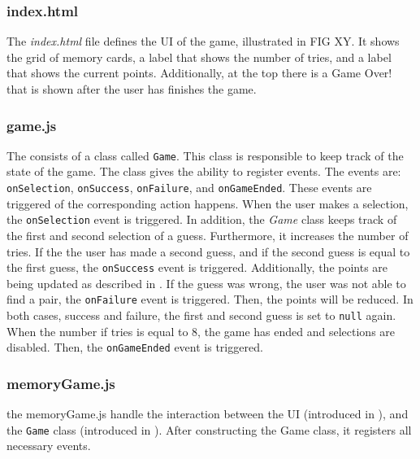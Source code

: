 \subsubsection{index.html}\label{subsubsec:03_impl_frontend_index}
The \textit{index.html} file defines the UI of the game, illustrated in FIG XY. It shows the grid of memory cards, a label that shows the number of tries, and a label that shows the current points. Additionally, at the top there is a Game Over! that is shown after the user has finishes the game.

\subsubsection{game.js}\label{subsubsec:03_impl_frontend_index}
The  consists of a class called \texttt{Game}. This class is responsible to keep track of the state of the game.
The class gives the ability to register events. The events are: \texttt{onSelection}, \texttt{onSuccess}, \texttt{onFailure}, and \texttt{onGameEnded}. These events are triggered of the corresponding action happens.
When the user makes a selection, the \texttt{onSelection} event is triggered. In addition, the \textit{Game} class keeps track of the first and second selection of a guess. Furthermore, it increases the number of tries.
If the the user has made a second guess, and if the second guess is equal to the first guess, the \texttt{onSuccess} event is triggered. Additionally, the points are being updated as described in .
If the guess was wrong, the user was not able to find a pair, the \texttt{onFailure} event is triggered. Then, the points will be reduced.
In both cases, success and failure, the first and second guess is set to \texttt{null} again.
%
When the number if tries is equal to 8, the game has ended and selections are disabled. Then, the \texttt{onGameEnded} event is triggered.

\subsubsection{memoryGame.js}\label{subsubsec:03_impl_frontend_index}
the memoryGame.js handle the interaction between the UI (introduced in ), and the \texttt{Game} class (introduced in ).
After constructing the Game class, it registers all necessary events.


